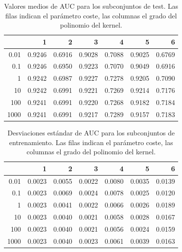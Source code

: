 \documentclass[12pt]{scrartcl}
\begin{document}
\begin{table}[ht]
\centering
\begin{tabular}{rrrrrrr}
  \hline
 & 1 & 2 & 3 & 4 & 5 & 6 \\ 
  \hline
0.01 & 0.9246 & 0.6916 & 0.9028 & 0.7088 & 0.9025 & 0.6769 \\ 
  0.1 & 0.9246 & 0.6950 & 0.9223 & 0.7070 & 0.9049 & 0.6916 \\ 
  1 & 0.9242 & 0.6987 & 0.9227 & 0.7278 & 0.9205 & 0.7090 \\ 
  10 & 0.9242 & 0.6991 & 0.9221 & 0.7269 & 0.9214 & 0.7176 \\ 
  100 & 0.9241 & 0.6991 & 0.9220 & 0.7268 & 0.9182 & 0.7184 \\ 
  1000 & 0.9241 & 0.6991 & 0.9217 & 0.7289 & 0.9157 & 0.7183 \\ 
   \hline
\end{tabular}
\caption{Valores medios de AUC para los subconjuntos de test. Las filas indican el parámetro coste, las columnas el grado del polinomio del kernel.} 
\label{table:test}
\end{table}
\begin{table}[ht]
\centering
\begin{tabular}{rrrrrrr}
  \hline
 & 1 & 2 & 3 & 4 & 5 & 6 \\ 
  \hline
0.01 & 0.0023 & 0.0055 & 0.0022 & 0.0080 & 0.0035 & 0.0139 \\ 
  0.1 & 0.0023 & 0.0069 & 0.0024 & 0.0078 & 0.0025 & 0.0120 \\ 
  1 & 0.0023 & 0.0041 & 0.0022 & 0.0066 & 0.0026 & 0.0189 \\ 
  10 & 0.0023 & 0.0040 & 0.0021 & 0.0058 & 0.0028 & 0.0167 \\ 
  100 & 0.0023 & 0.0040 & 0.0021 & 0.0056 & 0.0024 & 0.0159 \\ 
  1000 & 0.0023 & 0.0040 & 0.0023 & 0.0061 & 0.0039 & 0.0163 \\ 
   \hline
\end{tabular}
\caption{Desviaciones estándar de AUC para los subconjuntos de entrenamiento. Las filas indican el parámetro coste, las columnas el grado del polinomio del kernel.} 
\label{table:sdtrain}
\end{table}%
\end{document}
